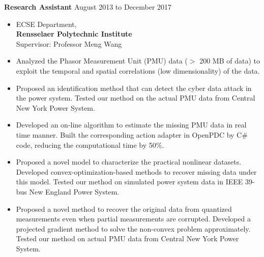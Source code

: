 \documentclass[10pt]{article}
\newenvironment{innerlist}[1][\enskip\textbullet]%
        {\begin{itemize}[#1,leftmargin=*,parsep=0pt,itemsep=0pt,topsep=0pt,partopsep=0pt]}
        {\end{itemize}}
\begin{document}
\textbf{Research Assistant} \hfill {August 2013 to December 2017}
\begin{innerlist}
\item[] ECSE Department,\\
\textbf{Rensselaer Polytechnic Institute}\\
Supervisor: Professor Meng Wang
\item Analyzed the Phasor Measurement Unit (PMU) data ($>$ 200 MB of data) to exploit the temporal and spatial correlations (low dimensionality) of the data.
\item Proposed an identification method that can detect the cyber data attack in the power system. Tested our method on the actual PMU data from Central New York Power System.
\item Developed an on-line algorithm to estimate the missing PMU data in real time manner. Built the corresponding action adapter in OpenPDC by C\# code, reducing the computational time by 50\%.
\item Proposed a novel model to characterize the practical nonlinear datasets. Developed convex-optimization-based methods to recover missing data under this model. Tested our method on simulated power system data in IEEE 39-bus New England Power System. 
\item Proposed a novel method to recover the original data from quantized measurements even when partial measurements are corrupted. Developed a projected gradient method to solve the non-convex problem approximately. Tested our method on actual PMU data from Central New York Power System. \\
\end{innerlist}

\end{document}
